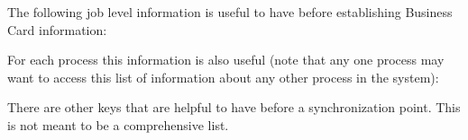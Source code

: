 {\large {}}

{\large {}}

{\large {}}


The following job level information is useful to have before establishing Business Card information:


For each process this information is also useful (note that any one process may want to access this list of information about any other process in the system):


There are other keys that are helpful to have before a synchronization point. This is not meant to be a comprehensive list.
